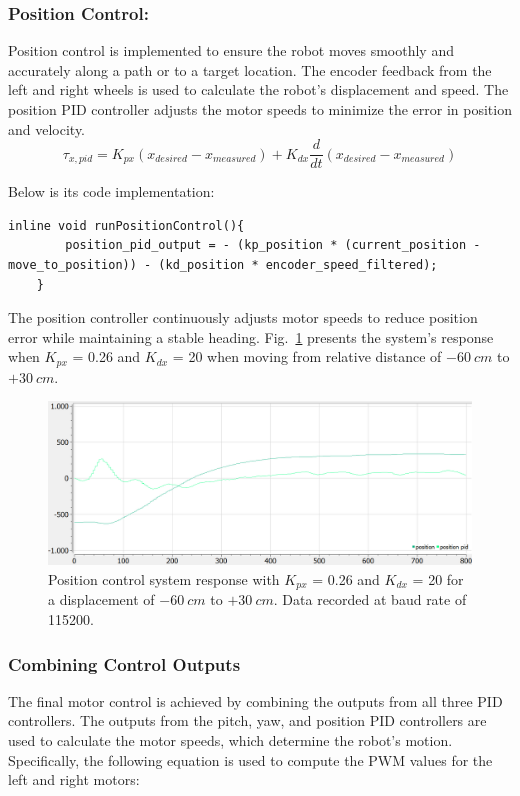 \subsubsection{Position Control:}
Position control is implemented to ensure the robot moves smoothly and accurately along a path or to a target location. The encoder feedback from the left and right wheels is used to calculate the robot's displacement and speed. The position PID controller adjusts the motor speeds to minimize the error in position and velocity.
\begin{equation}
	\tau_{x,pid} = K_{px}(x_{desired} - x_{measured}) + K_{dx}\frac{d}{dt}(x_{desired} - x_{measured})
\end{equation}

Below is its code implementation:
\begin{lstlisting}[style=cppstyle2]
	inline void runPositionControl(){
		position_pid_output = - (kp_position * (current_position - move_to_position)) - (kd_position * encoder_speed_filtered);
	}
\end{lstlisting}

The position controller continuously adjusts motor speeds to reduce position error while maintaining a stable heading. Fig.~\ref{fig:pid_postition} presents the system's response when \(K_{px}\) = 0.26 and $K_{dx}$ = 20 when moving from relative distance of $-60 \ cm$ to $+30 \ cm$.
\begin{figure}[H]
	\centering
	\includegraphics[width=0.8\linewidth]{assets/pid_position_kp_0_26_kd_20.png}
	\caption{Position control system response with \(K_{px}\) = 0.26 and $K_{dx}$ = 20 for a displacement of $-60 \ cm$ to $+30 \ cm$. Data recorded at baud rate of 115200.}
	\label{fig:pid_postition}
\end{figure}


\subsubsection{Combining Control Outputs}
The final motor control is achieved by combining the outputs from all three PID controllers. The outputs from the pitch, yaw, and position PID controllers are used to calculate the motor speeds, which determine the robot's motion. Specifically, the following equation is used to compute the PWM values for the left and right motors:

